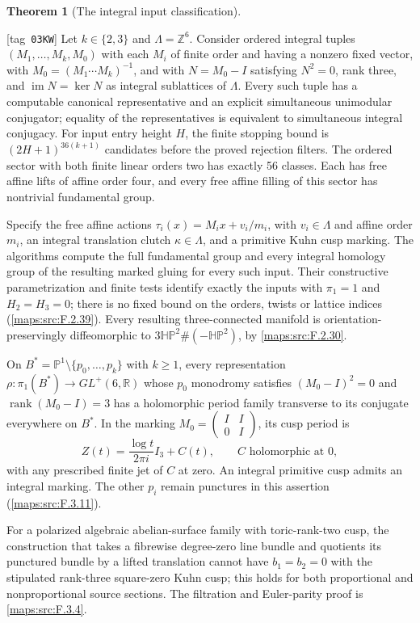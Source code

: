 \documentclass[11pt,a4paper]{article}
\numberwithin{equation}{section}
\theoremstyle{definition}
\newtheorem{maintheorem}{Theorem}
\newcommand{\StatementRecord}[4]{{\upshape\footnotesize[tag~\texttt{#3}]}\enspace\ignorespaces}
\begin{document}
\hypertarget{main-V-F}{}
\begin{maintheorem}[The integral input classification]
\hypertarget{tag-03KW}{}\label{series:V:F}
\StatementRecord{series:V:F}{proved}{03KW}{\cref{maps:src:F.2.39}, \cref{maps:src:F.3.11}, \cref{maps:src:F.3.4}}
Let $k\in\{2,3\}$ and $\Lambda=\mathbb Z^6$.
Consider ordered integral tuples $(M_1,\ldots,M_k,M_0)$ with each
$M_i$ of finite order and having a nonzero fixed vector, with
$M_0=(M_1\cdots M_k)^{-1}$, and with
$N=M_0-I$ satisfying $N^2=0$, rank three, and
$\operatorname{im}N=\ker N$ as integral sublattices of $\Lambda$.
Every such tuple has a computable canonical representative and an
explicit simultaneous unimodular conjugator; equality of the
representatives is equivalent to simultaneous integral conjugacy.
For input entry height $H$, the finite stopping bound is
$(2H+1)^{36(k+1)}$ candidates before the proved rejection filters.
The ordered sector with both finite linear orders two has exactly
56 classes.  Each has free affine lifts of affine order four,
and every free affine filling of this sector has nontrivial
fundamental group.

Specify the free affine actions
$\tau_i(x)=M_ix+v_i/m_i$, with $v_i\in\Lambda$ and affine order $m_i$, an integral translation clutch $\kappa\in\Lambda$,
and a primitive Kuhn cusp marking.  The algorithms compute the
full fundamental group and every integral homology group of the
resulting marked gluing for every such input.  Their constructive
parametrization and finite tests identify exactly the inputs with
$\pi_1=1$ and $H_2=H_3=0$; there is no fixed bound on the
orders, twists or lattice indices (\cref{maps:src:F.2.39}).
Every resulting three-connected manifold is orientation-preservingly
diffeomorphic to $3\mathbb{HP}^2\#(-\mathbb{HP}^2)$, by
\cref{maps:src:F.2.30}.

On $B^*=\mathbb P^1\setminus\{p_0,\ldots,p_k\}$ with $k\ge1$,
every representation $\rho:\pi_1(B^*)\to GL^+(6,\mathbb R)$
whose $p_0$ monodromy satisfies $(M_0-I)^2=0$ and
$\operatorname{rank}(M_0-I)=3$ has a holomorphic period family
transverse to its conjugate everywhere on $B^*$. In the marking
$M_0=\left(\begin{smallmatrix}I&I\\0&I\end{smallmatrix}\right)$,
its cusp period is
\[
 Z(t)=\frac{\log t}{2\pi i}I_3+C(t),\qquad C\text{ holomorphic at }0,
\]
with any prescribed finite jet of $C$ at zero. An integral primitive
cusp admits an integral marking. The other $p_i$ remain punctures
in this assertion (\cref{maps:src:F.3.11}).

For a polarized algebraic abelian-surface family with toric-rank-two
cusp, the construction that takes a fibrewise degree-zero line bundle
and quotients its punctured bundle by a lifted translation cannot
have $b_1=b_2=0$ with the stipulated rank-three square-zero Kuhn
cusp; this holds for both proportional and nonproportional source
sections. The filtration and Euler-parity proof is
\cref{maps:src:F.3.4}.

\end{maintheorem}
\end{document}

